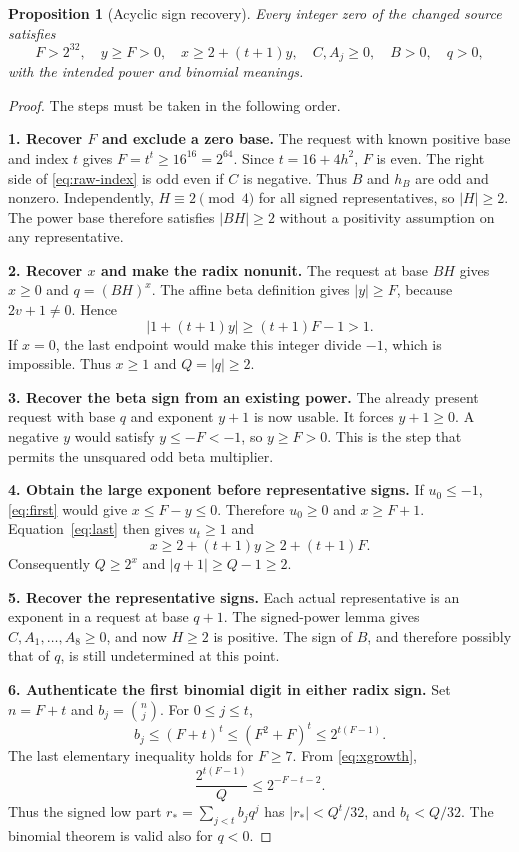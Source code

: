 \documentclass[11pt]{article}
\newtheorem{proposition}[theorem]{Proposition}
\begin{document}
\begin{proposition}[Acyclic sign recovery]\label{prop:bootstrap}
Every integer zero of the changed source satisfies
\[
 F>2^{32},\quad y\ge F>0,\quad x\ge2+(t+1)y,
 \quad C,A_j\ge0,\quad B>0,\quad q>0,
\]
with the intended power and binomial meanings.
\end{proposition}
\begin{proof}
The steps must be taken in the following order.

\textbf{1. Recover $F$ and exclude a zero base.}
The request with known positive base and index $t$ gives
$F=t^t\ge16^{16}=2^{64}$. Since $t=16+4h^2$, $F$ is even.
The right side of \eqref{eq:raw-index} is odd even if $C$ is negative.
Thus $B$ and $h_B$ are odd and nonzero. Independently,
$H\equiv2\pmod4$ for all signed representatives, so $|H|\ge2$.
The power base therefore satisfies $|BH|\ge2$ without a positivity
assumption on any representative.

\textbf{2. Recover $x$ and make the radix nonunit.}
The request at base $BH$ gives $x\ge0$ and $q=(BH)^x$.
The affine beta definition gives $|y|\ge F$, because $2v+1\ne0$.
Hence
\[
 |1+(t+1)y|\ge(t+1)F-1>1.
\]
If $x=0$, the last endpoint would make this integer divide $-1$,
which is impossible. Thus $x\ge1$ and $Q=|q|\ge2$.

\textbf{3. Recover the beta sign from an existing power.}
The already present request with base $q$ and exponent $y+1$ is now
usable. It forces $y+1\ge0$. A negative $y$ would satisfy
$y\le-F<-1$, so $y\ge F>0$. This is the step that permits the
unsquared odd beta multiplier.

\textbf{4. Obtain the large exponent before representative signs.}
If $u_0\le-1$, \eqref{eq:first} would give
$x\le F-y\le0$. Therefore $u_0\ge0$ and $x\ge F+1$.
Equation~\eqref{eq:last} then gives $u_t\ge1$ and
\begin{equation}\label{eq:xgrowth}
 x\ge2+(t+1)y\ge2+(t+1)F.
\end{equation}
Consequently $Q\ge2^x$ and $|q+1|\ge Q-1\ge2$.

\textbf{5. Recover the representative signs.}
Each actual representative is an exponent in a request at base $q+1$.
The signed-power lemma gives $C,A_1,\ldots,A_8\ge0$, and now $H\ge2$
is positive. The sign of $B$, and therefore possibly that of $q$, is
still undetermined at this point.

\textbf{6. Authenticate the first binomial digit in either radix sign.}
Set $n=F+t$ and $b_j=\binom{n}{j}$. For $0\le j\le t$,
\[
 b_j\le(F+t)^t\le(F^2+F)^t\le2^{t(F-1)}.
\]
The last elementary inequality holds for $F\ge7$. From
\eqref{eq:xgrowth},
\[
 \frac{2^{t(F-1)}}{Q}\le2^{-F-t-2}.
\]
Thus the signed low part
$r_* =\sum_{j<t}b_jq^j$ has $|r_*|<Q^t/32$, and $b_t<Q/32$.
The binomial theorem is valid also for $q<0$.


\end{proof}
\end{document}
